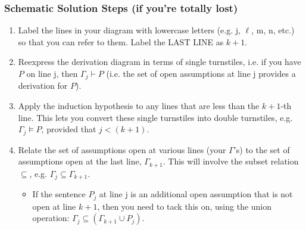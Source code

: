 \begin{frame}
\frametitle{Schematic Solution Steps (if you're totally lost)}

\begin{enumerate}[<+->]

\small

\item Label the lines in your diagram with lowercase letters (e.g. j, $\ell$, m, n, etc.) so that you can refer to them. Label the LAST LINE as $k+1$. 

\item  Reexpress the derivation diagram in terms of single turnstiles, i.e. if you have $P$ on line j, then $\Gamma_j \vdash P$ (i.e. the set of open assumptions at line j provides a derivation for $P$).

\item Apply the induction hypothesis to any lines that are less than the $k +1 $-th line. This lets you convert these single turnstiles into double turnstiles, e.g. $\Gamma_j \vDash P$, provided that $j < (k+1)$.

\item Relate the set of assumptions open at various lines (your $\Gamma$'s) to the set of assumptions open at the last line, $\Gamma_{k +1} $. This will involve the subset relation $\subseteq$, e.g. $\Gamma_j \subseteq \Gamma_{k +1} $. 
\begin{itemize}

\item If the sentence $P_j$ at line j is an additional open assumption that is not open at line $k+1$, then you need to tack this on, using the union operation: $\Gamma_j \subseteq (\Gamma_{k +1} \cup P_j) $.

\end{itemize}



\end{enumerate}

\end{frame}

